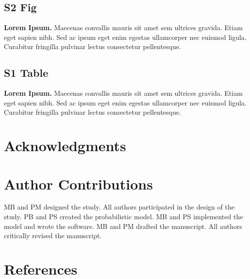 \documentclass[10pt,letterpaper]{article}
\begin{document}
\subsection*{S2 Fig}
\label{S2_Fig}
{\bf Lorem Ipsum.} Maecenas convallis mauris sit amet sem ultrices gravida. Etiam eget sapien nibh. Sed ac ipsum eget enim egestas ullamcorper nec euismod ligula. Curabitur fringilla pulvinar lectus consectetur pellentesque.

\subsection*{S1 Table}
\label{tab:bench2010plas_full}
{\bf Lorem Ipsum.} Maecenas convallis mauris sit amet sem ultrices gravida. Etiam eget sapien nibh. Sed ac ipsum eget enim egestas ullamcorper nec euismod ligula. Curabitur fringilla pulvinar lectus consectetur pellentesque.

\section*{Acknowledgments}

\section*{Author Contributions}
MB and PM designed the study. All authors participated in the design of the study. PB and PS created the probabilistic model. MB and PS implemented the model and wrote the software. MB and PM drafted the manuscript. All authors critically revised the manuscript.

\nolinenumbers

\section*{References}




%
%
% 
% 
% 
\end{document}
